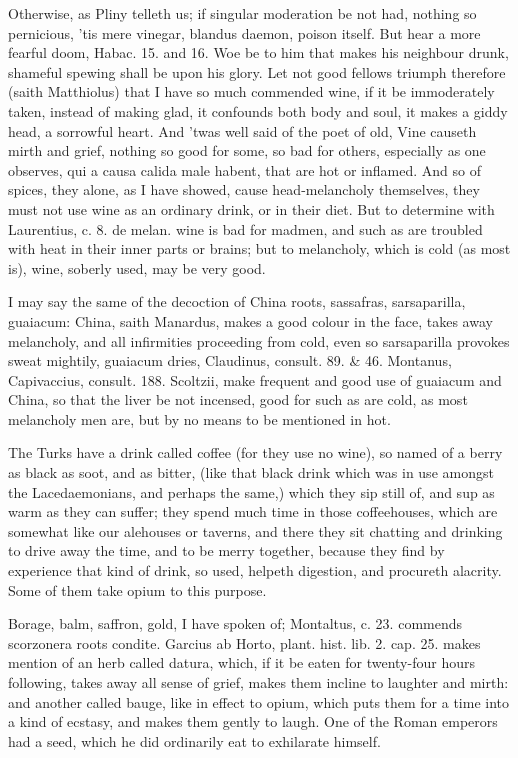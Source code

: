 Otherwise, as  Pliny telleth us; if singular moderation be not
had, nothing so pernicious, 'tis mere vinegar, blandus daemon,
poison itself. But hear a more fearful doom, Habac.  15. and 16. Woe
be to him that makes his neighbour drunk, shameful spewing shall be
upon his glory. Let not good fellows triumph therefore (saith
Matthiolus) that I have so much commended wine, if it be immoderately
taken, instead of making glad, it confounds both body and soul, it
makes a giddy head, a sorrowful heart. And 'twas well said of the poet
of old, Vine causeth mirth and grief, nothing so good for some,
so bad for others, especially as one observes, qui a causa calida
male habent, that are hot or inflamed. And so of spices, they alone, as
I have showed, cause head-melancholy themselves, they must not use wine
as an ordinary drink, or in their diet. But to determine with
Laurentius, c. 8. de melan. wine is bad for madmen, and such as are
troubled with heat in their inner parts or brains; but to melancholy,
which is cold (as most is), wine, soberly used, may be very good.

I may say the same of the decoction of China roots, sassafras,
sarsaparilla, guaiacum: China, saith Manardus, makes a good colour in
the face, takes away melancholy, and all infirmities proceeding from
cold, even so sarsaparilla provokes sweat mightily, guaiacum dries,
Claudinus, consult. 89. \& 46. Montanus, Capivaccius, consult. 188.
Scoltzii, make frequent and good use of guaiacum and China, so
that the liver be not incensed, good for such as are cold, as most
melancholy men are, but by no means to be mentioned in hot.

The Turks have a drink called coffee (for they use no wine), so named
of a berry as black as soot, and as bitter, (like that black drink
which was in use amongst the Lacedaemonians, and perhaps the same,)
which they sip still of, and sup as warm as they can suffer; they spend
much time in those coffeehouses, which are somewhat like our alehouses
or taverns, and there they sit chatting and drinking to drive away the
time, and to be merry together, because they find by experience that
kind of drink, so used, helpeth digestion, and procureth alacrity. Some
of them take opium to this purpose.

Borage, balm, saffron, gold, I have spoken of; Montaltus, c. 23.
commends scorzonera roots condite. Garcius ab Horto, plant. hist. lib.
2. cap. 25. makes mention of an herb called datura, which, if it
be eaten for twenty-four hours following, takes away all sense of
grief, makes them incline to laughter and mirth: and another called
bauge, like in effect to opium, which puts them for a time into a kind
of ecstasy, and makes them gently to laugh. One of the Roman emperors
had a seed, which he did ordinarily eat to exhilarate himself.


